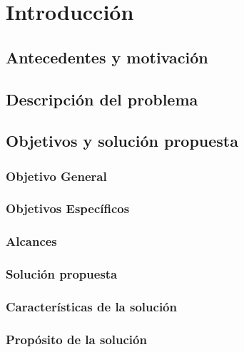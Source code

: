 \chapter{Introducci\'on}
\label{cap:intro}



\section{Antecedentes y motivaci\'on}
\label{intro:motivacion}



\section{Descripci\'on del problema}
\label{intro:problema}




\section{Objetivos y solución propuesta}


\subsection{Objetivo General}


\subsection{Objetivos Espec\'ificos}


\subsection{Alcances}



\subsection{Soluci\'on propuesta}
\label{intro:solucionpropuesta}



\subsection{Caracter\'isticas de la solución}
\label{intro:caracteristicassolucion}


\subsection{Prop\'osito de la solución}
\label{intro:propositosolucion}



